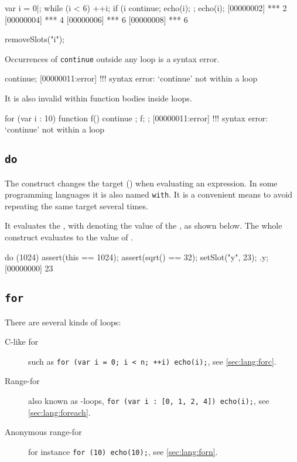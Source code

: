 \begin{urbiscript}
var i = 0|;
while (i < 6)
{
  ++i;
  if (i %
    continue;
  echo(i);
};
echo(i);
[00000002] *** 2
[00000004] *** 4
[00000006] *** 6
[00000008] *** 6
\end{urbiscript}
\begin{urbicomment}
removeSlots("i");
\end{urbicomment}

Occurrences of \lstinline{continue} outside any loop is a syntax error.

\begin{urbiscript}
continue;
[00000011:error] !!! syntax error: `continue' not within a loop
\end{urbiscript}

It is also invalid within function bodies inside loops.

\begin{urbiscript}
for (var i : 10)
{
  function f() { continue };
  f;
};
[00000011:error] !!! syntax error: `continue' not within a loop
\end{urbiscript}

\subsection{\lstinline{do}}
\label{sec:lang:do}

The  construct changes the target (\this) when evaluating an
expression.  In some programming languages it is also named
\lstinline{with}.  It is a convenient means to avoid repeating the same
target several times.


It evaluates the , with \this denoting the value of the
, as shown below.  The whole construct evaluates to the
value of .

\begin{urbiscript}
do (1024)
{
  assert(this == 1024);
  assert(sqrt() == 32);
  setSlot("y", 23);
}.y;
[00000000] 23
\end{urbiscript}


\subsection{\lstinline{for}}
\label{sec:lang:for}

There are several kinds of  loops:
\begin{description}
\item[C-like for] such as
  \lstinline|for (var i = 0; i < n; ++i) echo(i);|, see
  \autoref{sec:lang:forc}.
\item[Range-for] also known as -loops,
  \lstinline|for (var i : [0, 1, 2, 4]) echo(i);|, see
  \autoref{sec:lang:foreach}.
\item[Anonymous range-for] for instance \lstinline|for (10) echo(10);|, see
  \autoref{sec:lang:forn}.
\end{description}

